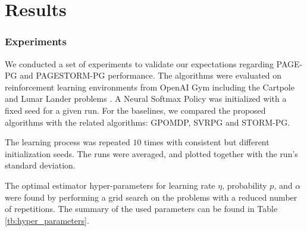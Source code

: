 \documentclass[10pt,twocolumn,letterpaper]{article}
\begin{document}
\section{Results} \label{results}
\subsubsection*{Experiments}
We conducted a set of experiments to validate our expectations regarding PAGE-PG and PAGESTORM-PG performance. The algorithms were evaluated on reinforcement learning environments from OpenAI Gym including the Cartpole and Lunar Lander problems \cite{brockman2016openai}. 
A Neural Softmax Policy was initialized with a fixed seed for a given run. For the baselines, we compared the proposed algorithms with the related algorithms: GPOMDP, SVRPG and STORM-PG. 
 
 The learning process was repeated $10$ times with consistent but different initialization seeds. The runs were averaged, and plotted together with the run's standard deviation. 

The optimal estimator hyper-parameters for learning rate $\eta$, probability $p$, and $\alpha$ were found by performing a grid search on the problems with a reduced number of repetitions. The summary of the used parameters can be found in Table \ref{tb:hyper_parameters}.
\end{document}
